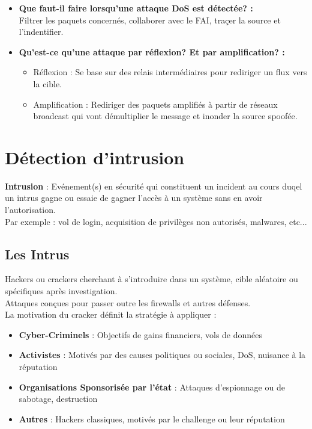 \documentclass{report}
\begin{document}
\begin{itemize}
				\item \textbf{Que faut-il faire lorsqu'une attaque DoS est détectée? : }\\

					Filtrer les paquets concernés, collaborer avec le FAI, traçer la source et l'indentifier.\\

				\item \textbf{Qu'est-ce qu'une attaque par réflexion? Et par amplification? :}\\

					\begin{itemize}
						\item Réflexion : Se base sur des relais intermédiaires pour rediriger un flux vers la cible.
						\item Amplification : Rediriger des paquets amplifiés à partir de réseaux broadcast qui vont démultiplier le message et inonder la source spoofée.\\
					\end{itemize}

			\end{itemize}

\chapter{Détection d'intrusion}

	\textbf{Intrusion} : Evénement(s) en sécurité qui constituent un incident au cours duqel un intrus gagne ou essaie de gagner l'accès à un système sans en avoir l'autorisation.\\

	Par exemple : vol de login, acquisition de privilèges non autorisés, malwares, etc...\\

	\section{Les Intrus}

		Hackers ou crackers cherchant à s'introduire dans un système, cible aléatoire ou spécifiques après investigation.\\
		Attaques conçues pour passer outre les firewalls et autres défenses.\\

		La motivation du cracker définit la stratégie à appliquer : \\

		\begin{itemize}
			\item \textbf{Cyber-Criminels} : Objectifs de gains financiers, vols de données
			\item \textbf{Activistes} : Motivés par des causes politiques ou sociales, DoS, nuisance à la réputation
			\item \textbf{Organisations Sponsorisée par l'état} : Attaques d'espionnage ou de sabotage, destruction
			\item \textbf{Autres} : Hackers classiques, motivés par le challenge ou leur réputation
		\end{itemize}
\end{document}
